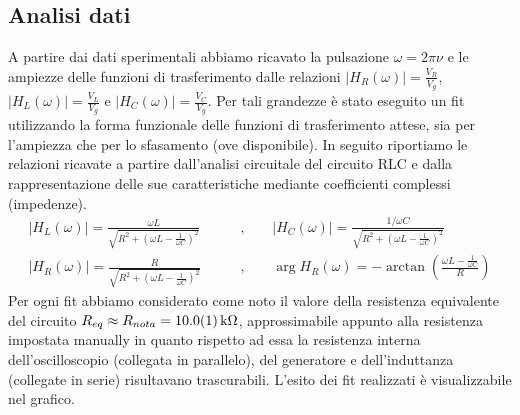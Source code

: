 \documentclass[a4paper]{article}
\begin{document}
\subsection{Analisi dati}
A partire dai dati sperimentali abbiamo ricavato la pulsazione $\omega = 2\pi \nu$ e le ampiezze delle funzioni di trasferimento dalle relazioni $|H_R(\omega)| = \frac{V_R}{V_g}$, $|H_L(\omega)| = \frac{V_L}{V_g}$ e $|H_C(\omega)| = \frac{V_C}{V_g}$. 
Per tali grandezze è stato eseguito un fit utilizzando la forma funzionale delle funzioni di trasferimento attese, sia per l'ampiezza che per lo sfasamento (ove disponibile). In seguito riportiamo le relazioni ricavate a partire dall'analisi circuitale del circuito RLC e dalla rappresentazione delle sue caratteristiche mediante coefficienti complessi (impedenze).
\begin{align}
	 |H_L(\omega)| = \frac{\omega L}{\sqrt{R^2 + \left(\omega L-\frac{1}{\omega C}\right)^2}} \qquad & \text{,} \qquad |H_C(\omega)| = \frac{1/\omega C}{\sqrt{R^2 + \left(\omega L-\frac{1}{\omega C}\right)^2}} \label{eq:ampiezze VL, Vc RLC} \\
	 |H_R(\omega)| = \frac{R}{\sqrt{R^2 + \left(\omega L-\frac{1}{\omega C}\right)^2}} \qquad & \text{,} \qquad \arg H_R(\omega) = -\arctan\left(\frac{\omega L -\frac{1}{\omega C}}{R}\right) \label{eq:Vr_RLC} %
\end{align}
Per ogni fit abbiamo considerato come noto il valore della resistenza equivalente del circuito $R_{eq} \approx R_{nota} = \SI{10.0 \pm 0.1}{k\ohm}$, approssimabile appunto alla resistenza impostata manually in quanto rispetto ad essa la resistenza interna dell'oscilloscopio (collegata in parallelo), del generatore e dell'induttanza (collegate in serie) risultavano trascurabili. L'esito dei fit realizzati è visualizzabile nel grafico.
\end{document}
